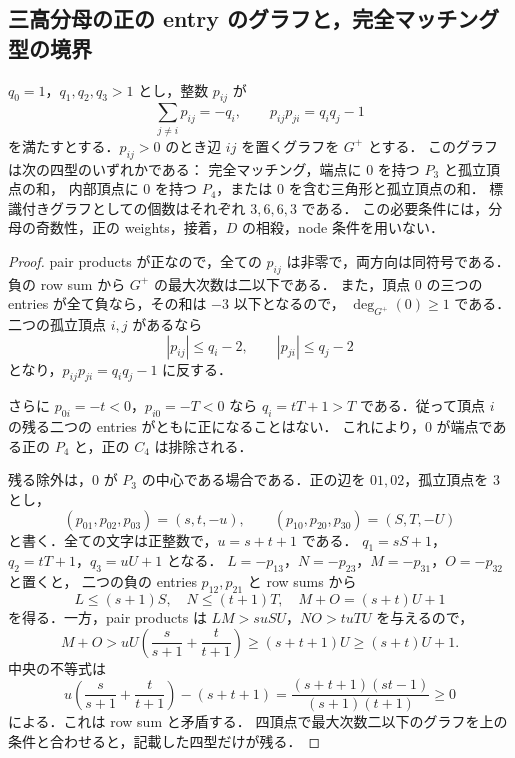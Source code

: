 
\subsection{三高分母の正の entry のグラフと，完全マッチング型の境界}
\label{sm14:section}

\begin{proposition}[三高分母に残る四つの正符号型]
\label{sm14:four-sign-types}
$q_0=1$，$q_1,q_2,q_3>1$ とし，整数 $p_{ij}$ が
\[
 \sum_{j\ne i}p_{ij}=-q_i,
 \qquad p_{ij}p_{ji}=q_iq_j-1
\]
を満たすとする．$p_{ij}>0$ のとき辺 $ij$ を置くグラフを $G^+$ とする．
このグラフは次の四型のいずれかである：
完全マッチング，端点に $0$ を持つ $P_3$ と孤立頂点の和，
内部頂点に $0$ を持つ $P_4$，または $0$ を含む三角形と孤立頂点の和．
標識付きグラフとしての個数はそれぞれ $3,6,6,3$ である．
この必要条件には，分母の奇数性，正の weights，接着，$D$ の相殺，node 条件を用いない．
\end{proposition}

\begin{proof}
pair products が正なので，全ての $p_{ij}$ は非零で，両方向は同符号である．
負の row sum から $G^+$ の最大次数は二以下である．
また，頂点 $0$ の三つの entries が全て負なら，その和は $-3$ 以下となるので，
$\deg_{G^+}(0)\geq1$ である．二つの孤立頂点 $i,j$ があるなら
\[
 |p_{ij}|\leq q_i-2,\qquad |p_{ji}|\leq q_j-2
\]
となり，$p_{ij}p_{ji}=q_iq_j-1$ に反する．

さらに $p_{0i}=-t<0$，$p_{i0}=-T<0$ なら
$q_i=tT+1>T$ である．従って頂点 $i$ の残る二つの entries がともに正になることはない．
これにより，$0$ が端点である正の $P_4$ と，正の $C_4$ は排除される．

残る除外は，$0$ が $P_3$ の中心である場合である．正の辺を $01,02$，孤立頂点を $3$ とし，
\[
 (p_{01},p_{02},p_{03})=(s,t,-u),\qquad
 (p_{10},p_{20},p_{30})=(S,T,-U)
\]
と書く．全ての文字は正整数で，$u=s+t+1$ である．
$q_1=sS+1$，$q_2=tT+1$，$q_3=uU+1$ となる．
$L=-p_{13}$，$N=-p_{23}$，$M=-p_{31}$，$O=-p_{32}$ と置くと，
二つの負の entries $p_{12},p_{21}$ と row sums から
\[
 L\leq(s+1)S,\quad N\leq(t+1)T,
 \quad M+O=(s+t)U+1
\]
を得る．一方，pair products は
$LM>suSU$，$NO>tuTU$ を与えるので，
\[
 M+O>uU\left(\frac{s}{s+1}+\frac{t}{t+1}\right)
 \geq(s+t+1)U\geq(s+t)U+1.
\]
中央の不等式は
\[
 u\left(\frac{s}{s+1}+\frac{t}{t+1}\right)-(s+t+1)
 =\frac{(s+t+1)(st-1)}{(s+1)(t+1)}\geq0
\]
による．これは row sum と矛盾する．
四頂点で最大次数二以下のグラフを上の条件と合わせると，記載した四型だけが残る．
\end{proof}

